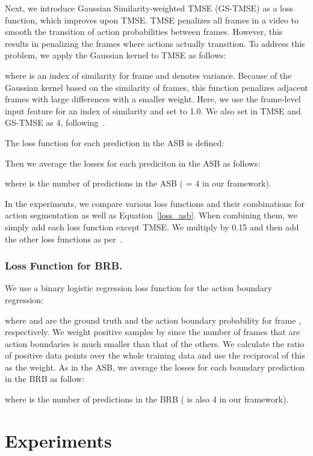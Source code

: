 \documentclass[10pt,twocolumn,letterpaper]{article}
\begin{document}
Next, we introduce Gaussian Similarity-weighted TMSE (GS-TMSE) as a loss function, which improves upon TMSE.
TMSE penalizes all frames in a video to smooth the transition of action probabilities between frames.
However, this results in penalizing the frames where actions actually transition.
To address this problem, we apply the Gaussian kernel to TMSE as follows:

\noindent
where  is an index of similarity for frame  and  denotes variance.
Because of the Gaussian kernel based on the similarity of frames, this function penalizes adjacent frames with large differences with a smaller weight.
Here, we use the frame-level input feature for an index of similarity and set  to 1.0.
We also set  in TMSE and GS-TMSE as 4, following~\cite{mstcn}.

The loss function for each prediction in the ASB is defined:

Then we average the losses for each prediciton in the ASB as follows:

where  is the number of predictions in the ASB ( = 4 in our framework).

In the experiments, we compare various loss functions and their combinations for action segmentation as well as Equation~\ref{loss_asb}. When combining them, we simply add each loss function except TMSE. We multiply  by 0.15 and then add the other loss functions as per~\cite{mstcn}. 



\subsubsection{Loss Function for BRB.}
\label{sec:loss_brb}
We use a binary logistic regression loss function for the action boundary regression:

\noindent
where  and  are the ground truth and the action boundary probability for frame , respectively. 
We weight positive samples by  since the number of frames that are action boundaries is much smaller than that of the others. 
We calculate the ratio of positive data points over the whole training data and use the reciprocal of this as the weight.
As in the ASB, we average the losses for each boundary prediction in the BRB as follow:

where  is the number of predictions in the BRB ( is also 4 in our framework).




\section{Experiments}
\end{document}
